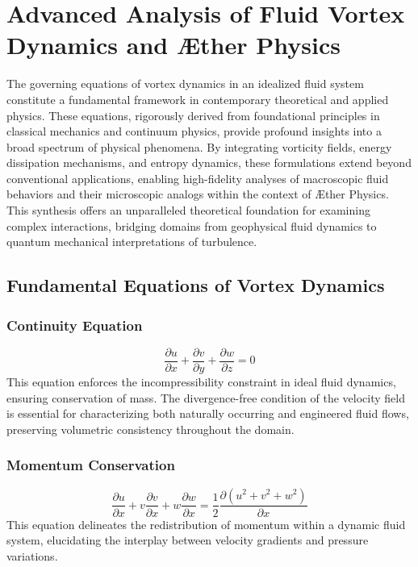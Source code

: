 

    \section*{Advanced Analysis of Fluid Vortex Dynamics and Æther Physics}

    The governing equations of vortex dynamics in an idealized fluid system constitute a fundamental framework in contemporary theoretical and applied physics. These equations, rigorously derived from foundational principles in classical mechanics and continuum physics, provide profound insights into a broad spectrum of physical phenomena. By integrating vorticity fields, energy dissipation mechanisms, and entropy dynamics, these formulations extend beyond conventional applications, enabling high-fidelity analyses of macroscopic fluid behaviors and their microscopic analogs within the context of Æther Physics. This synthesis offers an unparalleled theoretical foundation for examining complex interactions, bridging domains from geophysical fluid dynamics to quantum mechanical interpretations of turbulence.

    \subsection*{Fundamental Equations of Vortex Dynamics}

    \subsubsection*{Continuity Equation}
    \begin{equation*}
        \frac{\partial u}{\partial x} + \frac{\partial v}{\partial y} + \frac{\partial w}{\partial z} = 0
    \end{equation*}
    This equation enforces the incompressibility constraint in ideal fluid dynamics, ensuring conservation of mass. The divergence-free condition of the velocity field is essential for characterizing both naturally occurring and engineered fluid flows, preserving volumetric consistency throughout the domain.

    \subsubsection*{Momentum Conservation}
    \begin{equation*}
        \frac{\partial u}{\partial x} + v \frac{\partial v}{\partial x} + w \frac{\partial w}{\partial x} = \frac{1}{2} \frac{\partial (u^2 + v^2 + w^2)}{\partial x}
    \end{equation*}
    This equation delineates the redistribution of momentum within a dynamic fluid system, elucidating the interplay between velocity gradients and pressure variations.

